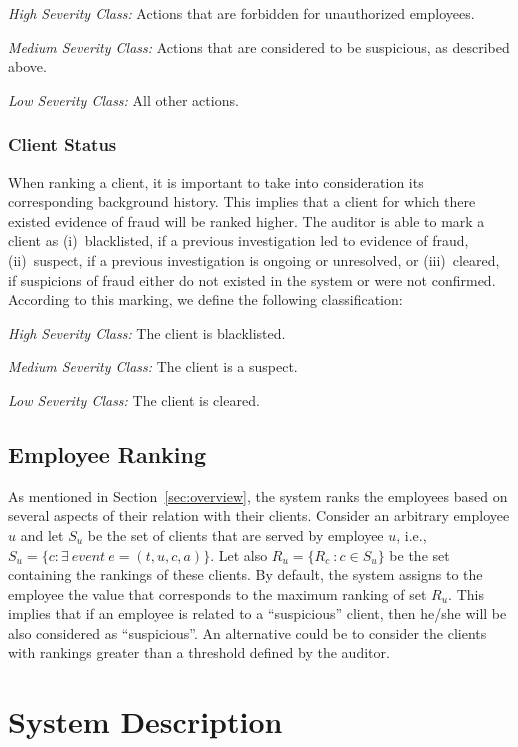 \documentclass[conference]{IEEEtran}
\begin{document}
\emph{High Severity Class:} Actions that are forbidden for
unauthorized employees.

\emph{Medium Severity Class:} Actions that are considered to be
  suspicious, as described above.

\emph{Low Severity Class: }All other actions.

\subsubsection{Client Status}
\label{sec:previous-client-ranking}

When ranking a client, it is important to take into consideration
its corresponding background history. This implies that a client for
which there existed evidence of fraud will be ranked higher. The
auditor is able to mark a client as (i)~blacklisted, if a previous
investigation led to evidence of fraud, (ii)~suspect, if a previous
investigation is ongoing or unresolved, or (iii)~cleared, if
suspicions of fraud either do not existed in the system or were not
confirmed. According to this marking, we define the following
classification:

\emph{High Severity Class:} The client is blacklisted.

\emph{Medium Severity Class:} The client is a suspect.

\emph{Low Severity Class:} The client is cleared.


\subsection{Employee Ranking}

As mentioned in Section~\ref{sec:overview}, the system ranks the
employees based on several aspects of their relation with their
clients. Consider an arbitrary employee $u$  and let $S_u$ be the
set of clients that are served by employee $u$, i.e., $S_u = \{c :
\exists~event~e=(t,u,c,a)\}$. Let also $R_u = \{R_c \ : c \in S_u\}$
be the set containing the rankings of these clients. By default, the
system assigns to the employee the value that corresponds to the
maximum ranking of set $R_u$. This implies that if an employee is
related to a ``suspicious'' client, then he/she will be also
considered as ``suspicious''. An alternative could be to consider
the clients with rankings greater than a threshold defined by the
auditor.

\section{System Description}
\label{sec:description}
\end{document}
